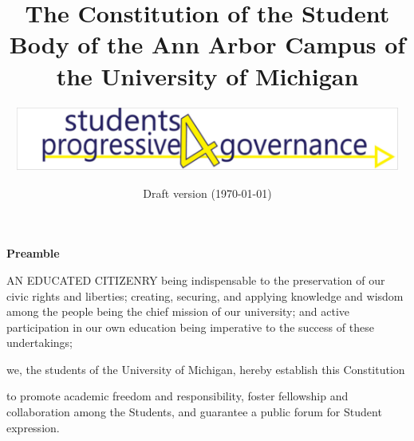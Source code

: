 \documentclass{constitution}
\begin{document}
	\title{The Constitution of the Student Body of the Ann Arbor Campus of the University of Michigan}
	\author{\includegraphics[width=5in]{S4PGlogo}}
	\date{Draft version (\today)}
	\maketitle
	\tableofcontents
	\newpage

	\pagestyle{fancy}
	\headheight 35pt
	\thispagestyle{empty}
	\linenumbers
	
	\begin{center}
		\bfseries Preamble
	\end{center}

	AN EDUCATED CITIZENRY being indispensable to the preservation of our civic rights and liberties; creating, securing, and applying knowledge and wisdom among the people being the chief mission of our university; and active participation in our own education being imperative to the success of these undertakings;

		we, the students of the University of Michigan, hereby establish this Constitution

	to promote academic freedom and responsibility, foster fellowship and collaboration among the Students, and guarantee a public forum for Student expression.
	

	

	
	
	
	
	
	
	
	
	
	

	
	
	
\end{document}
